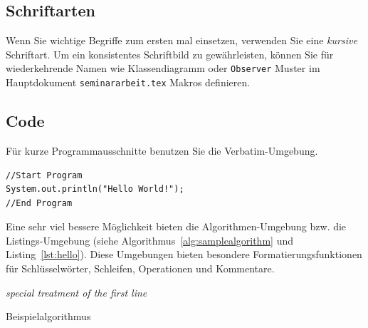 \documentclass[deutsch]{llncs}
\newcommand{\uml}[1]{\texttt{#1}\xspace}
\newcommand{\cd}{\textsf{Klassendiagramm}\xspace}
\begin{document}
\subsection{Schriftarten}
\label{subsec:fonts}

Wenn Sie wichtige Begriffe zum ersten mal einsetzen, verwenden Sie eine \emph{kursive} Schriftart. 
Um ein konsistentes Schriftbild zu gewährleisten, können Sie für wiederkehrende Namen wie \cd oder \uml{Observer} Muster im Hauptdokument \texttt{seminararbeit.tex} Makros definieren. 

\subsection{Code}
\label{subsec:code}

Für kurze Programmausschnitte benutzen Sie die Verbatim-Umgebung.

\begin{verbatim}
//Start Program
System.out.println("Hello World!");
//End Program
\end{verbatim}

Eine sehr viel bessere Möglichkeit bieten die Algorithmen-Umgebung bzw. die Listings-Umgebung (siehe Algorithmus~\ref{alg:samplealgorithm} und Listing~\ref{lst:hello}). Diese Umgebungen bieten besondere Formatierungsfunktionen für Schlüsselwörter, Schleifen, Operationen und Kommentare. 

\begin{algorithm}[t]


\BlankLine

\emph{special treatment of the first line}\;
\caption{Beispielalgorithmus}\label{alg:samplealgorithm}
\end{algorithm}
\end{document}
